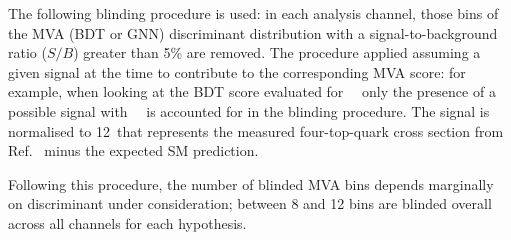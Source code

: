 %
The following blinding procedure is used: in each analysis 
channel, those bins of the MVA (BDT or GNN) discriminant distribution with a signal-to-background ratio ($S/B$) 
greater than 5\% are removed. The procedure applied assuming a given signal at the time to contribute to the corresponding MVA score: for example, when looking at the BDT score evaluated for ~\gev\ only the presence of a possible signal with ~\gev\ is accounted for in the blinding procedure. 
The signal is normalised to 12~\ifb that represents the measured four-top-quark cross section from Ref.~\cite{ATLAS-CONF-2021-013} 
minus the expected SM prediction.  

Following this procedure, the number of blinded MVA bins depends marginally on \mH discriminant under consideration; between 8 and 12 bins are blinded overall across all channels for each \mH hypothesis. 
